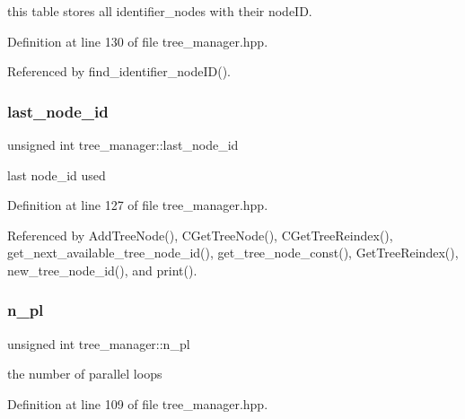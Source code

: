 this table stores all identifier\+\_\+nodes with their node\+ID. 



Definition at line 130 of file tree\+\_\+manager.\+hpp.



Referenced by find\+\_\+identifier\+\_\+node\+I\+D().

\mbox{\label{classtree__manager_a1c8e32360835503fb5089a3b49739a7d}} 
\subsubsection{\texorpdfstring{last\+\_\+node\+\_\+id}{last\_node\_id}}
{\footnotesize\ttfamily unsigned int tree\+\_\+manager\+::last\+\_\+node\+\_\+id\hspace{0.3cm}{\ttfamily [private]}}



last node\+\_\+id used 



Definition at line 127 of file tree\+\_\+manager.\+hpp.



Referenced by Add\+Tree\+Node(), C\+Get\+Tree\+Node(), C\+Get\+Tree\+Reindex(), get\+\_\+next\+\_\+available\+\_\+tree\+\_\+node\+\_\+id(), get\+\_\+tree\+\_\+node\+\_\+const(), Get\+Tree\+Reindex(), new\+\_\+tree\+\_\+node\+\_\+id(), and print().

\mbox{\label{classtree__manager_a0db5ffaf1c720d84572a390333cbec5d}} 
\subsubsection{\texorpdfstring{n\+\_\+pl}{n\_pl}}
{\footnotesize\ttfamily unsigned int tree\+\_\+manager\+::n\+\_\+pl\hspace{0.3cm}{\ttfamily [private]}}



the number of parallel loops 



Definition at line 109 of file tree\+\_\+manager.\+hpp.



